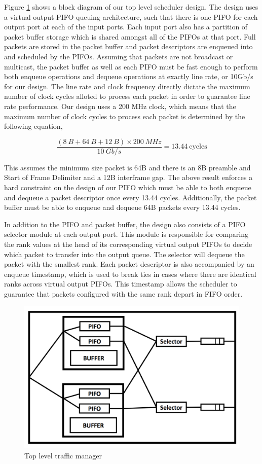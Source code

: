 Figure \ref{fig:tm-top} shows a block diagram of our top level scheduler design. The design uses a virtual output PIFO queuing architecture, such that there is one PIFO for each output port at each of the input ports. Each input port also has a partition of packet buffer storage which is shared amongst all of the PIFOs at that port. Full packets are stored in the packet buffer and packet descriptors are enqueued into and scheduled by the PIFOs. Assuming that packets are not broadcast or multicast, the packet buffer as well as each PIFO must be fast enough to perform both enqueue operations and dequeue operations at exactly line rate, or 10Gb/s for our design. The line rate and clock frequency directly dictate the maximum number of clock cycles alloted to process each packet in order to guarantee line rate performance. Our design uses a 200 MHz clock, which means that the maximum number of clock cycles to process each packet is determined by the following equation,

$$ \frac{(8~B + 64~B + 12~B)\times 200~MHz}{10~Gb/s} = 13.44~\mbox{cycles} $$

This assumes the minimum size packet is 64B and there is an 8B preamble and Start of Frame Delimiter and a 12B interframe gap. The above result enforces a hard constraint on the design of our PIFO which must be able to both enqueue and dequeue a packet descriptor once every 13.44 cycles. Additionally, the packet buffer must be able to enqueue and dequeue 64B packets every 13.44 cycles. 

In addition to the PIFO and packet buffer, the design also consists of a PIFO selector module at each output port. This module is responsible for comparing the rank values at the head of its corresponding virtual output PIFOs to decide which packet to transfer into the output queue. The selector will dequeue the packet with the smallest rank. Each packet descriptor is also accompanied by an enqueue timestamp, which is used to break ties in cases where there are identical ranks across virtual output PIFOs. This timestamp allows the scheduler to guarantee that packets configured with the same rank depart in FIFO order.


\begin{figure}[!h]
\includegraphics[width=1\linewidth]{figures/design/tm-top}
\caption{Top level traffic manager}
\label{fig:tm-top}
\end{figure}

